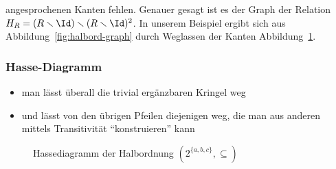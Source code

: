 angesprochenen Kanten fehlen. Genauer gesagt ist es der Graph der
Relation $H_R = (R\smallsetminus \Id) \smallsetminus (
R\smallsetminus\Id)^2$. In unserem Beispiel ergibt sich aus
Abbildung~\ref{fig:halbord-graph} durch Weglassen der Kanten
Abbildung~\ref{fig:halbord-hasse}.
%
\begin{tutorium}
  \subsubsection*{Hasse-Diagramm}
  \begin{itemize}
  \item man lässt überall die trivial ergänzbaren Kringel weg
  \item und lässt von den übrigen Pfeilen diejenigen weg, die man aus
    anderen mittels Transitivität "`konstruieren"' kann
  \end{itemize}
\end{tutorium}
%
\begin{figure}[ht]
  \centering
  \caption{Hassediagramm der Halbordnung $(2^{\{a,b,c\}}, \subseteq)$}
  \label{fig:halbord-hasse}
\end{figure}

